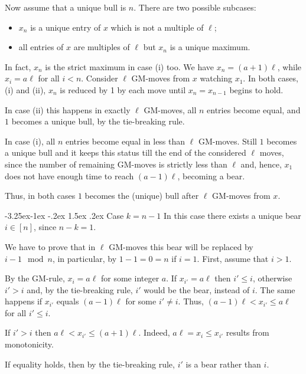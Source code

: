 \documentclass[10pt]{article}
\makeatletter
\renewcommand\subsection{\@startsection{subsection}{2}{\z@}
{-3.25ex\@plus -1ex \@minus -.2ex}
{1.5ex \@plus .2ex}
{\normalfont\normalsize\bfseries\boldmath}}
\theoremstyle{definition}
\makeatother
\begin{document}
\medskip 

Now assume that a unique bull is $n$. 
There are two possible subcases: 
\begin{itemize}
\item[(i)] $x_n$  is a unique entry of $x$ which is
not a multiple of $\ell$; 
\item[(ii)] all entries of $x$  are multiples of $\ell$ 
but $x_n$ is a unique maximum.  
\end{itemize}
In fact, $x_n$  is the strict maximum in case (i) too. 
We have $x_n  = (a+1) \ell$, 
while $x_i = a \ell$  for all $i < n$.   
Consider $\ell$  GM-moves from $x$  watching  $x_1$. 
In both cases, (i) and (ii), 
$x_n$  is reduced by 1 by each move 
until  $x_n = x_{n-1}$  begins to hold. 

In case (ii) this happens in exactly $\ell$ GM-moves, 
all $n$  entries become equal, 
and $1$ becomes a unique bull, by the tie-breaking rule. 

In case (i), all $n$ entries become equal in less than $\ell$ GM-moves. 
Still $1$ becomes a unique bull and it keeps this status 
till the end of the considered $\ell$ moves, 
since the number of remaining GM-moves 
is strictly less than $\ell$ and, hence, 
$x_1$ does not have enough time to reach $(a-1) \ell$, 
becoming a bear.  

Thus, in both cases $1$ becomes the (unique) bull after $\ell$ 
GM-moves from $x$.

\subsection{Case $k=n-1$}
In this case there exists a unique bear 
$i \in [n]$, since $n-k=1$. 

We have to prove that in $\ell$ GM-moves 
this bear will be replaced by $i-1 \mod n$,  
in particular, by $1-1=0=n$ if $i=1$.
First, assume that $i > 1$. 

\medskip 

By the GM-rule, $x_i = a \ell$ for some integer $a$.  
If  $x_{i'} = a \ell$ then  $i' \leq i$, 
otherwise  $i' > i$  and, 
by the tie-breaking rule, $i'$ would be the bear, instead of $i$. 
The same happens if  $x_{i'}$  equals $(a-1) \ell$ 
for some $i' \neq i$.
Thus, $(a-1) \ell < x_{i'} \leq a \ell$  for all $i' \leq i$.

If $i' > i$ then $a \ell < x_{i'} \leq (a+1) \ell$. 
Indeed, $a \ell = x_i \leq x_{i'}$  results from monotonicity.

If equality holds, then by the tie-breaking rule,  
$i'$ is a bear rather than $i$.
\end{document}
